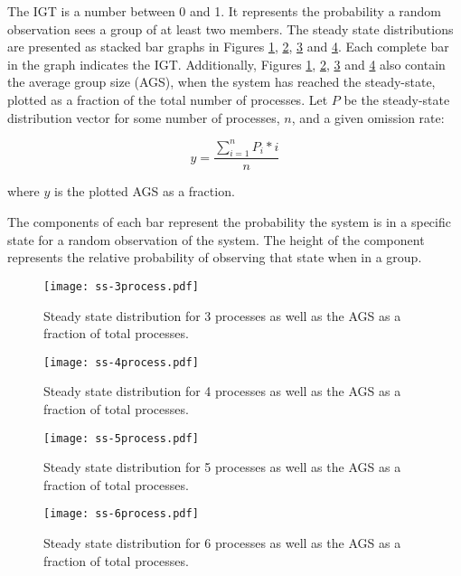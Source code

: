 The \ac{IGT} is a number between 0 and 1.
It represents the probability a random observation sees a group of at least two members.
The steady state distributions are presented as stacked bar graphs in Figures \ref{fig:ss-3process}, \ref{fig:ss-4process}, \ref{fig:ss-5process} and \ref{fig:ss-6process}.
Each complete bar in the graph indicates the \ac{IGT}.
Additionally, Figures \ref{fig:ss-3process}, \ref{fig:ss-4process}, \ref{fig:ss-5process} and \ref{fig:ss-6process} also contain the average group size (AGS), when the system has reached the steady-state, plotted as a fraction of the total number of processes.
Let $P$ be the steady-state distribution vector for some number of processes, $n$, and a given omission rate:

\begin{equation} y = \frac{\sum_{i=1}^{n} P_{i}*i}{n} \label{eq:ss-means} \end{equation}

where $y$ is the plotted \ac{AGS} as a fraction.

The components of each bar represent the probability the system is in a specific state for a random observation of the system.
The height of the component represents the relative probability of observing that state when in a group.

\begin{figure}
    \centering
    \texttt{[image: ss-3process.pdf]}
    \caption{Steady state distribution for 3 processes as well as the \ac{AGS} as a fraction of total processes.}
    \label{fig:ss-3process}
\end{figure}

\begin{figure}
    \centering
    \texttt{[image: ss-4process.pdf]}
    \caption{Steady state distribution for 4 processes as well as the \ac{AGS} as a fraction of total processes.}
    \label{fig:ss-4process}
\end{figure}

\begin{figure}
    \centering
    \texttt{[image: ss-5process.pdf]}
    \caption{Steady state distribution for 5 processes as well as the \ac{AGS} as a fraction of total processes.}
    \label{fig:ss-5process}
\end{figure}

\begin{figure}
    \centering
    \texttt{[image: ss-6process.pdf]}
    \caption{Steady state distribution for 6 processes as well as the \ac{AGS} as a fraction of total processes.}
    \label{fig:ss-6process}
\end{figure}

